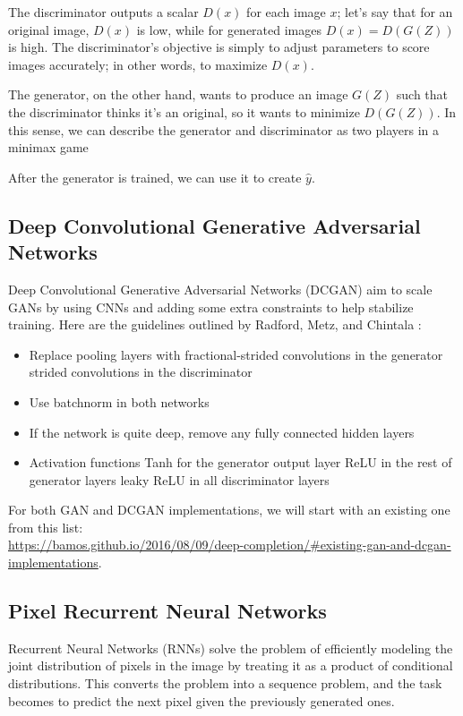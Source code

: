 \documentclass[10pt,twocolumn,letterpaper]{article}
\begin{document}
\par The discriminator outputs a scalar $D(x)$ for each image $x$; let's say that for an original image, $D(x)$ is low, while for generated images $D(x) = D(G(Z))$ is high. The discriminator's objective is simply to adjust parameters to score images accurately; in other words, to maximize $D(x)$.

The generator, on the other hand, wants to produce an image $G(Z)$ such that the discriminator thinks it's an original, so it wants to minimize $D(G(Z))$. In this sense, we can describe the generator and discriminator as two players in a minimax game \cite{GAN}

After the generator is trained, we can use it to create $\hat{y}$. 


\subsection{Deep Convolutional Generative Adversarial Networks}
Deep Convolutional Generative Adversarial Networks (DCGAN) aim to scale GANs by using CNNs and adding some extra constraints to help stabilize training. Here are the guidelines outlined by Radford, Metz, and Chintala \cite{DCGAN}:
\begin{itemize}
\item Replace pooling layers with
\subitem fractional-strided convolutions in the generator
\subitem strided convolutions in the discriminator
\item Use batchnorm in both networks
\item If the network is quite deep, remove any fully connected hidden layers
\item Activation functions
\subitem Tanh for the generator output layer
\subitem ReLU in the rest of generator layers 
\subitem leaky ReLU in all discriminator layers
\end{itemize}

For both GAN and DCGAN implementations, we will start with an existing one from this list: \\
 \url{https://bamos.github.io/2016/08/09/deep-completion/#existing-gan-and-dcgan-implementations}.

\subsection{Pixel Recurrent Neural Networks}
Recurrent Neural Networks (RNNs) solve the problem of efficiently modeling the joint distribution of pixels in the image by treating it as a product of conditional distributions. This converts the problem into a sequence problem, and the task becomes to predict the next pixel given the previously generated ones\cite{pixelRNN}. 
\end{document}
